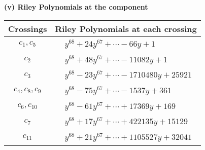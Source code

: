 \documentclass[1p]{elsarticle_modified}
\theoremstyle{definition}
\begin{document}
\flushleft \textbf{(v) Riley Polynomials at the component}\newline \\
\begin{tabular}{m{50pt}|m{274pt}}
Crossings & \hspace{64pt}Riley Polynomials at each crossing \\
\hline $$\begin{aligned}c_{1},c_{5}\end{aligned}$$&$\begin{aligned}
&y^{68}+24 y^{67}+\cdots-66 y+1
\end{aligned}$\\
\hline $$\begin{aligned}c_{2}\end{aligned}$$&$\begin{aligned}
&y^{68}+48 y^{67}+\cdots-11082 y+1
\end{aligned}$\\
\hline $$\begin{aligned}c_{3}\end{aligned}$$&$\begin{aligned}
&y^{68}-23 y^{67}+\cdots-1710480 y+25921
\end{aligned}$\\
\hline $$\begin{aligned}c_{4},c_{8},c_{9}\end{aligned}$$&$\begin{aligned}
&y^{68}-75 y^{67}+\cdots-1537 y+361
\end{aligned}$\\
\hline $$\begin{aligned}c_{6},c_{10}\end{aligned}$$&$\begin{aligned}
&y^{68}-61 y^{67}+\cdots+17369 y+169
\end{aligned}$\\
\hline $$\begin{aligned}c_{7}\end{aligned}$$&$\begin{aligned}
&y^{68}+17 y^{67}+\cdots+422135 y+15129
\end{aligned}$\\
\hline $$\begin{aligned}c_{11}\end{aligned}$$&$\begin{aligned}
&y^{68}+21 y^{67}+\cdots+1105527 y+32041
\end{aligned}$\\
\hline
\end{tabular}\\~\\
\end{document}
